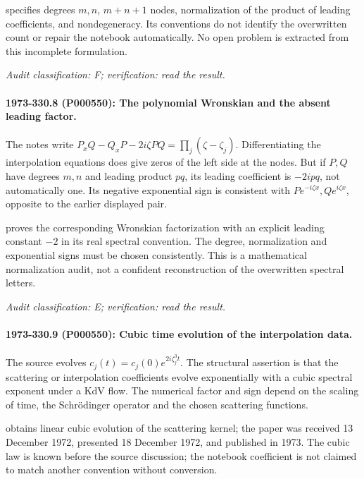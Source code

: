\citet[\S3, equations (44)--(49), Theorem~1]{shabat2014interpolation} specifies degrees \(m,n\), \(m+n+1\) nodes, normalization of the product of leading coefficients, and nondegeneracy. Its conventions do not identify the overwritten count or repair the notebook automatically. No open problem is extracted from this incomplete formulation.

\emph{Audit classification: F; verification: read the result.}

\paragraph{1973-330.8 (P000550): The polynomial Wronskian and the absent leading factor.}
The notes write \(P_xQ-Q_xP-2i\zeta PQ=\prod_j(\zeta-\zeta_j)\). Differentiating the interpolation equations does give zeros of the left side at the nodes. But if \(P,Q\) have degrees \(m,n\) and leading product \(pq\), its leading coefficient is \(-2ipq\), not automatically one. Its negative exponential sign is consistent with \(Pe^{-i\zeta x},Qe^{i\zeta x}\), opposite to the earlier displayed pair.

\citet[Theorem~1, equation (50)]{shabat2014interpolation} proves the corresponding Wronskian factorization with an explicit leading constant \(-2\) in its real spectral convention. The degree, normalization and exponential signs must be chosen consistently. This is a mathematical normalization audit, not a confident reconstruction of the overwritten spectral letters.

\emph{Audit classification: E; verification: read the result.}

\paragraph{1973-330.9 (P000550): Cubic time evolution of the interpolation data.}
The source evolves \(c_j(t)=c_j(0)e^{2i\zeta_j^3t}\). The structural assertion is that the scattering or interpolation coefficients evolve exponentially with a cubic spectral exponent under a KdV flow. The numerical factor and sign depend on the scaling of time, the Schrödinger operator and the chosen scattering functions.

\citet[equations (13), (18)]{shabat1973kdv} obtains linear cubic evolution of the scattering kernel; the paper was received 13 December 1972, presented 18 December 1972, and published in 1973. The cubic law is known before the source discussion; the notebook coefficient is not claimed to match another convention without conversion.


